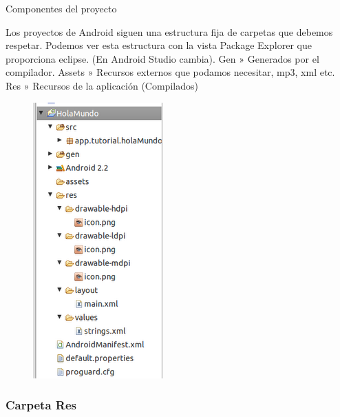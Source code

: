 \begin{frame}{Componentes del proyecto}
\begin{block}{}
Los proyectos de Android siguen una estructura fija de carpetas que debemos respetar. Podemos ver esta estructura con la vista Package Explorer que proporciona eclipse. (En Android Studio cambia). Gen » Generados por el compilador. Assets » Recursos externos que podamos necesitar, mp3, xml etc. Res » Recursos de la aplicación (Compilados)
\begin{figure}[H]
\centering
\includegraphics[scale=.3]{./img/estructuraCarpetas.png}
\end{figure}
\end{block}
\end{frame}

\subsubsection{Carpeta Res}

